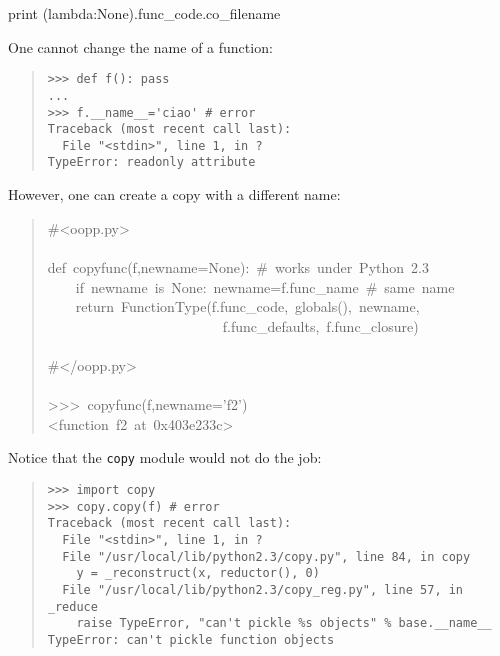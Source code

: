 \documentclass[10pt,english]{article}
\begin{document}
print (lambda:None).func{\_}code.co{\_}filename

One cannot change the name of a function:
\begin{quote}
\begin{verbatim}>>> def f(): pass
...
>>> f.__name__='ciao' # error
Traceback (most recent call last):
  File "<stdin>", line 1, in ?
TypeError: readonly attribute\end{verbatim}
\end{quote}

However, one can create a copy with a different name:
\begin{quote}
\begin{ttfamily}\begin{flushleft}
\mbox{{\#}<oopp.py>}\\
\mbox{}\\
\mbox{def~copyfunc(f,newname=None):~{\#}~works~under~Python~2.3}\\
\mbox{~~~~if~newname~is~None:~newname=f.func{\_}name~{\#}~same~name}\\
\mbox{~~~~return~FunctionType(f.func{\_}code,~globals(),~newname,~}\\
\mbox{~~~~~~~~~~~~~~~~~~~~~~~~~f.func{\_}defaults,~f.func{\_}closure)}\\
\mbox{}\\
\mbox{{\#}</oopp.py>}\\
\mbox{}\\
\mbox{>>>~copyfunc(f,newname='f2')}\\
\mbox{<function~f2~at~0x403e233c>}
\end{flushleft}\end{ttfamily}
\end{quote}

Notice that the \texttt{copy} module would not do the job:
\begin{quote}
\begin{verbatim}>>> import copy
>>> copy.copy(f) # error
Traceback (most recent call last):
  File "<stdin>", line 1, in ?
  File "/usr/local/lib/python2.3/copy.py", line 84, in copy
    y = _reconstruct(x, reductor(), 0)
  File "/usr/local/lib/python2.3/copy_reg.py", line 57, in _reduce
    raise TypeError, "can't pickle %s objects" % base.__name__
TypeError: can't pickle function objects\end{verbatim}
\end{quote}


\end{document}
